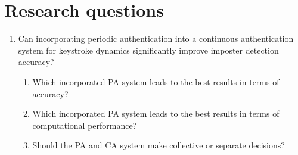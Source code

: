 \documentclass[informationsecurity]{gucmasterproject}
\begin{document}
\section{Research questions}\label{research:questions}
\begin{enumerate}
\item Can incorporating periodic authentication into a continuous authentication system for keystroke
dynamics significantly improve imposter detection accuracy?
\begin{enumerate}
\item Which incorporated PA system leads to the best results in terms of accuracy?
\item Which incorporated PA system leads to the best results in terms of computational performance?
\item Should the PA and CA system make collective or separate decisions?
\end{enumerate}
\end{enumerate}
%
\end{document}
